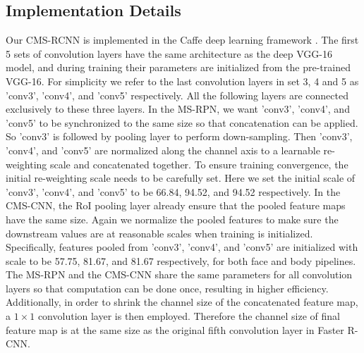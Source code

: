 \documentclass[10pt,journal,cspaper,compsoc]{IEEEtran}
\begin{document}
\subsection{Implementation Details}
\label{subsec:details}
Our CMS-RCNN is implemented in the Caffe deep learning framework \cite{jia2014caffe}. The first 5 sets of convolution layers have the same architecture as the deep VGG-16 model, and during training their parameters are initialized from the pre-trained VGG-16. For simplicity we refer to the last convolution layers in set 3, 4 and 5 as 'conv3', 'conv4', and 'conv5' respectively. All the following layers are connected exclusively to these three layers.
In the MS-RPN, we want 'conv3', 'conv4', and 'conv5' to be synchronized to the same size so that concatenation can be applied. So 'conv3' is followed by pooling layer to perform down-sampling. Then 'conv3', 'conv4', and 'conv5' are normalized along the channel axis to a learnable re-weighting scale and concatenated together. To ensure training convergence, the initial re-weighting scale needs to be carefully set. Here we set the initial scale of 'conv3', 'conv4', and 'conv5' to be 66.84, 94.52, and 94.52 respectively. 
In the CMS-CNN, the RoI pooling layer already ensure that the pooled feature maps have the same size. Again we normalize the pooled features to make sure the downstream values are at reasonable scales when training is initialized. Specifically, features pooled from 'conv3', 'conv4', and 'conv5' are initialized with scale to be 57.75, 81.67, and 81.67 respectively, for both face and body pipelines.
The MS-RPN and the CMS-CNN share the same parameters for all convolution layers so that computation can be done once, resulting in higher efficiency. Additionally, in order to shrink the channel size of the concatenated feature map, a $1\times 1$ convolution layer is then employed. Therefore the channel size of final feature map is at the same size as the original fifth convolution layer in Faster R-CNN.
\end{document}
